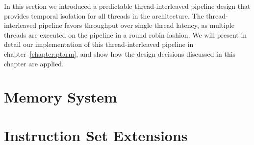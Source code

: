 In this section we introduced a predictable thread-interleaved pipeline design that provides temporal isolation for all threads in the architecture.
The thread-interleaved pipeline favors throughput over single thread latency, as multiple threads are executed on the pipeline in a round robin fashion.  
We will present in detail our implementation of this thread-interleaved pipeline in chapter~\ref{chapter:ptarm}, and show how the design decisions discussed in this chapter are applied.

\section{Memory System}
\label{section:memory_system}


\section{Instruction Set Extensions}
\label{sec:programming_models}

